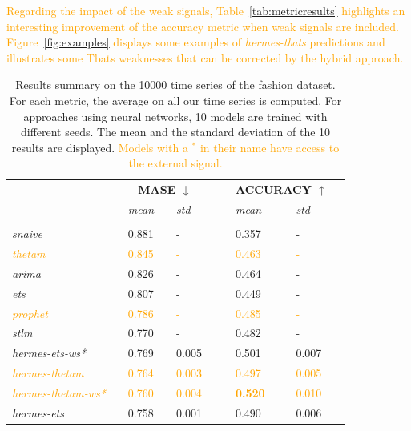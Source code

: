 \documentclass[10pt]{article} %
\begin{document}
\textcolor{orange}{Regarding the impact of the weak signals, Table~\ref{tab:metricresults} highlights an interesting improvement of the accuracy metric when weak signals are included. Figure~\ref{fig:examples} displays some examples of \textit{hermes-tbats} predictions and illustrates some Tbats weaknesses that can be corrected by the hybrid approach.}

\begin{table}
  \caption{Results summary on the 10000 time series of the fashion dataset. For each metric, the average on all our time series is computed. For approaches using neural networks, 10 models are trained with different seeds. The mean and the standard deviation of the 10 results are displayed. \textcolor{orange}{Models with a $^*$ in their name have access to the external signal.}}
  \centering
  \begin{tabular}{l||lllll|lllll}
   &&\multicolumn{3}{c}{\textbf{MASE $\downarrow$}} &&& \multicolumn{3}{c}{\textbf{ACCURACY $\uparrow$}}&\\
    &&  \textit{mean}  && \textit{std} &&&  \textit{mean}  && \textit{std}& \\
	 \hline
	 &&&&&&&&&&\\
     \textit{snaive} && 0.881 && - &&& 0.357 && - &\\
     \textcolor{orange}{\textit{thetam}} && \textcolor{orange}{0.845} && \textcolor{orange}{-} &&& \textcolor{orange}{0.463} && \textcolor{orange}{-}\\
     \textit{arima} && 0.826 && -&&& 0.464 && - & \\
     \textit{ets} && 0.807 && -&&& 0.449 && - & \\
     \textcolor{orange}{\textit{prophet}} && \textcolor{orange}{0.786} && \textcolor{orange}{-} &&& \textcolor{orange}{0.485} && \textcolor{orange}{-}\\
     \textit{stlm} && 0.770 && -&&& 0.482 && - & \\
     \textit{hermes-ets-ws*} && 0.769 && 0.005 &&& 0.501 && 0.007 &\\
     \textcolor{orange}{\textit{hermes-thetam}} && \textcolor{orange}{0.764} && \textcolor{orange}{0.003} &&& \textcolor{orange}{0.497} && \textcolor{orange}{0.005}\\
     \textcolor{orange}{\textit{hermes-thetam-ws*}} && \textcolor{orange}{0.760} && \textcolor{orange}{0.004} &&& \textcolor{orange}{\textbf{0.520}} && \textcolor{orange}{0.010}\\
     \textit{hermes-ets} && 0.758 && 0.001 &&& 0.490 && 0.006 &\\

\end{tabular}
\end{table}
\end{document}
